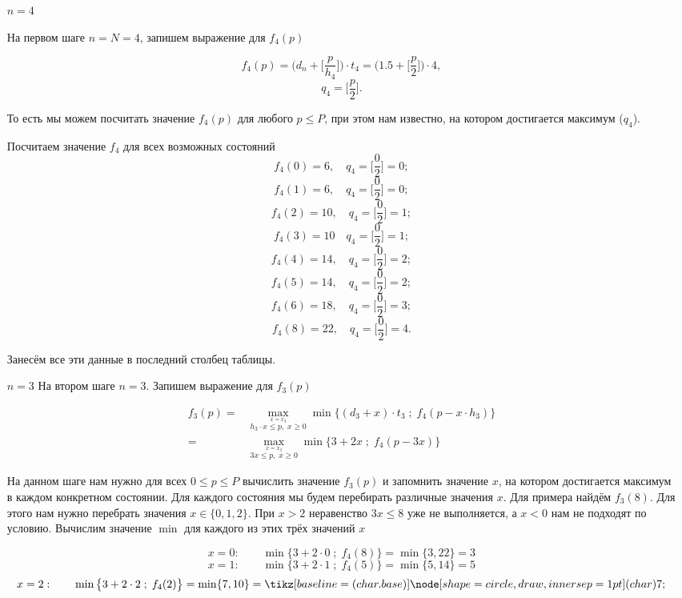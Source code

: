 \begin{enumerate}
	\item[$\boxed{n=4}$]
	
	На первом шаге $n = N = 4$, запишем выражение для $f_4(p)$
	
	\[
	f_4(p) = \bigg(d_n + \bigg[\frac{p}{h_4}\bigg]\bigg) \cdot t_4 = \bigg(1.5 + \bigg[\frac{p}{2}\bigg]\bigg) \cdot 4,
	\]
	\[
	q_4 = \bigg[\frac{p}{2}\bigg].
	\]
	
	То есть мы можем посчитать значение $f_4(p)$ для любого $p \le P$, при этом нам известно, на котором достигается максимум ($q_4$).
	
	Посчитаем значение $f_4$ для всех возможных состояний
	\[
	f_4(0) = 6, \quad q_4 = \bigg[\frac{0}{2}\bigg] = 0;
	\]
	\[
	f_4(1) = 6, \quad q_4 = \bigg[\frac{0}{2}\bigg] = 0;
	\]
	\[
	f_4(2) = 10, \quad q_4 = \bigg[\frac{0}{2}\bigg] = 1;
	\]
	\[
	f_4(3) = 10 \quad q_4 = \bigg[\frac{0}{2}\bigg] = 1;
	\]
	\[
	f_4(4) = 14, \quad q_4 = \bigg[\frac{0}{2}\bigg] = 2;
	\]
	\[
	f_4(5) = 14, \quad q_4 = \bigg[\frac{0}{2}\bigg] = 2;
	\]
	\[
	f_4(6) = 18, \quad q_4 = \bigg[\frac{0}{2}\bigg] = 3;
	\]
	\[
	f_4(8) = 22, \quad q_4 = \bigg[\frac{0}{2}\bigg] = 4.
	\]
	
	Занесём все эти данные в последний столбец таблицы.
	
	\item[$\boxed{n=3}$] На втором шаге $n = 3$. Запишем выражение для $f_3(p)$
	
	\begin{align*}
		f_3(p) =& \max_{\stackrel{x = x_3}{h_3 \cdot x \le p, \; x \ge 0}} \min\Big\{(d_3 + x) \cdot t_3 \; ; \; f_{4}(p - x \cdot h_3)\Big\} \\
		=& \max_{\stackrel{x = x_3}{3x \le p, \; x \ge 0}} \min\Big\{3 + 2x \; ; \; f_{4}(p - 3x)\Big\}
	\end{align*}
	
	На данном шаге нам нужно для всех $0 \le p \le P$ вычислить значение $f_3(p)$ и запомнить значение $x$, на котором достигается максимум в каждом конкретном состоянии. Для каждого состояния мы будем перебирать различные значения $x$. Для примера найдём $f_3(8)$. Для этого нам нужно перебрать значения $x \in \{0, 1, 2\}$. При $x > 2$ неравенство $3x \le 8$ уже не выполняется, а $x < 0$ нам не подходят по условию. Вычислим значение $\min$ для каждого из этих трёх значений $x$
	
	\[
	x = 0: \qquad \min\big\{3 + 2 \cdot 0 \; ; \; f_4(8)\big\} = \min\{3, 22\} = 3
	\]
	\[
	x = 1: \qquad \min\big\{3 + 2 \cdot 1 \; ; \; f_4(5)\big\} = \min\{5, 14\} = 5
	\]
	\[
	x = 2: \qquad \min\big\{3 + 2 \cdot 2 \; ; \; f_4(2)\big\} = \min\{7, 10\} = \circled{7}
	\]
	

\end{enumerate}
